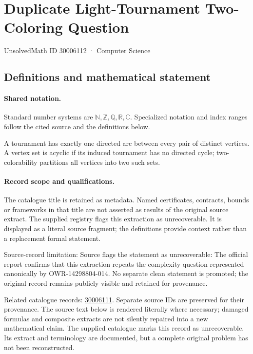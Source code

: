 \documentclass[11pt]{article}
\begin{document}
\setcounter{section}{30006111}
\section{Duplicate Light-Tournament Two-Coloring Question}\label{30006112}
{\small\sffamily UnsolvedMath ID 30006112 · Computer Science}
\subsection{Definitions and mathematical statement}

\paragraph{Shared notation.}Standard number systems are $\mathbb N,\mathbb Z,\mathbb Q,\mathbb R,\mathbb C$. Specialized notation and index ranges follow the cited source and the definitions below.


A tournament has exactly one directed arc between every pair of distinct vertices. A vertex set is acyclic if its induced tournament has no directed cycle; two-colorability partitions all vertices into two such sets.
\paragraph{Record scope and qualifications.}
The catalogue title is retained as metadata. Named certificates, contracts, bounds or frameworks in that title are not asserted as results of the original source extract.
The supplied registry flags this extraction as unrecoverable. It is displayed as a literal source fragment; the definitions provide context rather than a replacement formal statement.

Source-record limitation: Source flags the statement as unrecoverable: The official report confirms that this extraction repeats the complexity question represented canonically by OWR-14298804-014. No separate clean statement is promoted; the original record remains publicly visible and retained for provenance.

Related catalogue records: \href{https://mehmetmars7.github.io/Erdosproblems-llm-hunter/problem.html?type=open_problems&id=30006111}{30006111}. Separate source IDs are preserved for their provenance.
The source text below is rendered literally where necessary; damaged formulas and composite extracts are not silently repaired into a new mathematical claim.
The supplied catalogue marks this record as unrecoverable. Its extract and terminology are documented, but a complete original problem has not been reconstructed.
\end{document}
